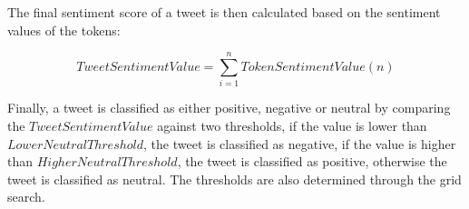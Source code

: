The final sentiment score of a tweet is then calculated based on the sentiment values of the tokens:

\begin{equation}
    Tweet Sentiment Value = \sum\limits_{i=1}^{n} Token Sentiment Value(n)
\end{equation}

Finally, a tweet is classified as either positive, negative or neutral by comparing the $TweetSentimentValue$ against two thresholds, if the value is lower than $LowerNeutralThreshold$, the tweet is classified as negative, if the value is higher than $HigherNeutralThreshold$, the tweet is classified as positive, otherwise the tweet is classified as neutral. The thresholds are also determined through the grid search.

\glsresetall

